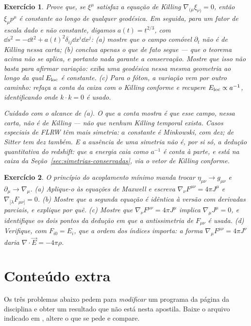 \documentclass[12pt,a4paper,oneside]{book}
\theoremstyle{rgplain}
\newtheorem{exercise}{Exercício}[chapter]
\theoremstyle{rgremark}
\begin{document}
\begin{exercise}
Prove que, se $\xi^\mu$ satisfaz a equação de Killing
$\nabla_{(\mu}\xi_{\nu)}=0$, então $\xi_\mu p^\mu$ é constante ao longo de
qualquer geodésica. Em seguida, para um fator de escala dado e não constante,
digamos $a(t)=t^{2/3}$, com
$\dd s^2=-\dd t^2+a(t)^2\delta_{ij}\dd x^i\dd x^j$: (a) mostre que o campo
comóvel $\partial_t$ \emph{não} é de Killing nessa carta; (b) conclua apenas o
que de fato segue --- que o teorema acima não se aplica, e portanto nada
\emph{garante} a conservação. Mostre que isso não basta para afirmar variação:
exiba uma geodésica nessa mesma geometria ao longo da qual $E_{\rm loc}$ é
constante. (c) Para o fóton, a variação vem por outro caminho: refaça a
conta da caixa com o Killing conforme e recupere $E_{\rm loc}\propto a^{-1}$,
identificando onde $k\cdot k=0$ é usado.

Cuidado com o alcance de (a). O que a conta mostra é que \emph{esse} campo,
\emph{nessa} carta, não é de Killing --- não que nenhum Killing temporal
exista. Casos especiais de FLRW têm mais simetria: $a$ constante é Minkowski,
com dez; de Sitter tem dez também. E a ausência de uma simetria não é, por si
só, a dedução \emph{quantitativa} do redshift: que a energia caia como
$a^{-1}$ é conta à parte, e está na caixa da
Seção~\ref{sec:simetrias-conservadas}, via o vetor de Killing conforme.
\end{exercise}

\begin{exercise}
O princípio do acoplamento mínimo manda trocar $\eta_{\mu\nu}\to g_{\mu\nu}$ e
$\partial_\mu\to\nabla_\mu$. (a) Aplique-o às equações de Maxwell e escreva
$\nabla_\nu F^{\mu\nu}=4\pi J^\mu$ e $\nabla_{[\lambda}F_{\mu\nu]}=0$.
(b) Mostre que a segunda equação é idêntica à versão com derivadas parciais, e
explique por quê. (c) Mostre que $\nabla_\nu F^{\mu\nu}=4\pi J^\mu$ implica
$\nabla_\mu J^\mu=0$, e identifique os \emph{dois} pontos da dedução em que a
antissimetria de $F_{\mu\nu}$ é usada. (d) Verifique, com
$F_{i0}=E_i$, que a ordem dos índices importa: a forma
$\nabla_\mu F^{\mu\nu}=4\pi J^\nu$ daria $\nabla\cdot\vec E=-4\pi\rho$.
\end{exercise}


\section{Conteúdo extra}

Os três problemas abaixo pedem para \emph{modificar} um programa da página da disciplina e obter um resultado que não está nesta apostila. Baixe o arquivo indicado em \href{\rgsitecodigos}{\texttt{\rgsitecodigos}}, altere o que se pede e compare.
\end{document}
